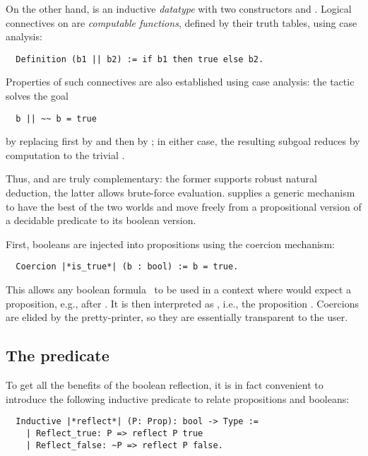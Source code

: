 On the other hand,  is an inductive \emph{datatype}
with two constructors  and .
Logical connectives on  are \emph{computable functions}, defined by
their truth tables, using case analysis:
\begin{lstlisting}
  Definition (b1 || b2) := if b1 then true else b2.
\end{lstlisting}
Properties of such connectives are also established using case
analysis: the tactic  solves the goal
\begin{lstlisting}
  b || ~~ b = true
\end{lstlisting}
by replacing  first by  and then by ; in either case,
the resulting subgoal reduces by computation to the trivial
.

Thus,  and  are truly complementary: the former
supports robust natural deduction, the latter allows brute-force
evaluation.
\ssr{} supplies
a generic mechanism to have the best of the two worlds and move freely
from a propositional version of a
decidable predicate to its boolean version.

First, booleans are injected into propositions
using the coercion mechanism:
\begin{lstlisting}
  Coercion |*is_true*| (b : bool) := b = true.
\end{lstlisting}
This allows any boolean formula~ to be used in a context
where \Coq{} would expect a proposition, e.g., after .
It is then interpreted as , i.e.,
the  proposition . Coercions are elided by the pretty-printer,
so they are essentially transparent to the user.


\subsection{The  predicate}\label{ssec:reflpred}

To get all the benefits of the boolean reflection, it is in fact
convenient to introduce the following inductive predicate
 to relate propositions and booleans:

\begin{lstlisting}
  Inductive |*reflect*| (P: Prop): bool -> Type :=
    | Reflect_true: P => reflect P true
    | Reflect_false: ~P => reflect P false.
\end{lstlisting}

